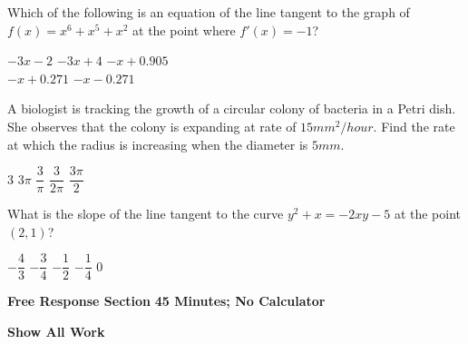 \begin{questions}
    \newpage

    \question Which of the following is an equation of the line tangent to the graph of $f(x) = x^6 + x^5 + x^2$ at the point where $f'(x) = -1$? \\

    \begin{oneparchoices}
        \choice $-3x - 2$
        \choice $-3x + 4$
        \choice $-x + 0.905$ \\[11pt]
        \makebox[0.23 \textwidth] \choice $-x + 0.271$
        \makebox[0.27 \textwidth] \choice $-x - 0.271$
    \end{oneparchoices} \par \horizontalline

    \question A biologist is tracking the growth of a circular colony of bacteria in a Petri dish. She observes that the colony is expanding at rate of $15 \si{mm^2 \per hour}$. Find the rate at which the radius is increasing when the diameter is $5 \si{mm}$. \\

    \begin{oneparchoices}
        \choice $3$
        \choice $3\pi$
        \choice $\dfrac{3}{\pi}$
        \choice $\dfrac{3}{2\pi}$
        \choice $\dfrac{3\pi}{2}$
    \end{oneparchoices} \par \horizontalline

    \question What is the slope of the line tangent to the curve $y^2 + x = -2xy - 5$ at the point $(2, 1)$? \\

    \begin{oneparchoices}
        \choice $-\dfrac{4}{3}$
        \choice $-\dfrac{3}{4}$
        \choice $-\dfrac{1}{2}$
        \choice $-\dfrac{1}{4}$
        \choice $0$
    \end{oneparchoices} \par \horizontalline
\end{questions}

\newpage
{}

\textbf{Free Response Section} \hfill \textbf{45 Minutes; No Calculator} \\[11pt]

\begin{center}
    \textbf{Show All Work}
\end{center}
\vspace{11pt}


